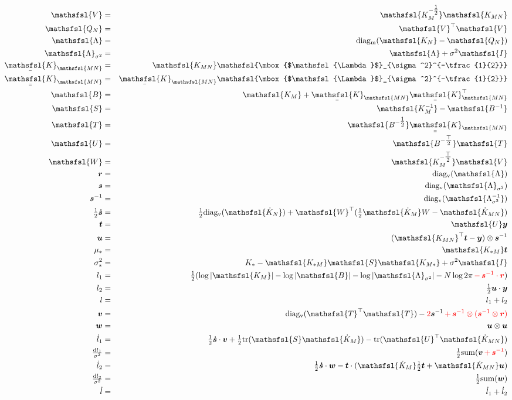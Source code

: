 \documentclass[12pt]{article}
\newcommand{\red}{\textcolor{red}}
\newcommand{\dif}{\mathrm{d}}
\newcommand{\myu}[1]{\underaccent{\bar}{#1}}
\newcommand{\onehalf}{\tfrac{1}{2}}
\newcommand{\mat}[1]{\mbox{$\mathsfsl{#1}$}}
\newcommand{\myvec}[1]{\mbox{\boldmath$#1$}}
\newcommand{\diagv}[1]{\mathrm{diag_v}(#1)}
\newcommand{\diagm}[1]{\mathrm{diag_m}(#1)}
\newcommand{\trace}[1]{\mathrm{tr}(#1)}
\newcommand{\transm}[1]{\mat{#1}^\top}
\newcommand{\imat}[1]{\mat{#1^{-1}}}
\newcommand{\ichol}[1]{\mat{#1^{-\onehalf}}}
\newcommand{\icholt}[1]{\mat{#1^{-\tfrac{\top}{2}}}}
\newcommand{\Km}{\mat{K_M}}
\newcommand{\dKm}{\mat{\dot{K}_M}}
\newcommand{\dkn}{\mat{\dot{K}_N}}
\newcommand{\Kmn}{\mat{K_{MN}}}
\newcommand{\Knm}{\transm{K_{MN}}}
\newcommand{\uKnm}{\myu{\mat{K}}_{\mathsfsl{MN}}^\top}
\newcommand{\dKmn}{\mat{\dot{K}_{MN}}}
\newcommand{\uKmn}{\myu{\mat{K}}_{\mathsfsl{MN}}}
\newcommand{\uuKmn}{\myu{\myu{\mat{K}}}_{\mathsfsl{MN}}}
\newcommand{\dl}{\dot{l}}
\newcommand{\vecr}{\myvec{r}}
\newcommand{\vecs}{\myvec{s}}
\newcommand{\vect}{\myvec{t}}
\newcommand{\vecv}{\myvec{v}}
\newcommand{\vecu}{\myvec{u}}
\newcommand{\vecw}{\myvec{w}}
\newcommand{\vecy}{\myvec{y}}
\newcommand{\vecsdh}{\onehalf\myvec{\dot{s}}}
\newcommand{\vecis}{\myvec{s}^{-1}}
\newcommand{\matB}{\mat{B}}
\newcommand{\matI}{\mat{I}}
\newcommand{\matS}{\mat{S}}
\newcommand{\matT}{\mat{T}}
\newcommand{\matU}{\mat{U}}
\newcommand{\matV}{\mat{V}}
\newcommand{\matW}{\mat{W}}
\newcommand{\Lam}{\mat{\Lambda}}
\newcommand{\Lamss}{\mat{\Lambda}_{\sigma^2}}
\newcommand{\Lamssi}{\imat{\Lambda_{\sigma^2}}}
\begin{document}
\begin{eqnarray*}
\matV & = & \ichol{K_M}\Kmn \\
\mat{Q_N} & = & \transm{V} \matV \\
\Lam & = & \diagm{\mat{K_N} - \mat{Q_N}} \\
\Lamss & = & \Lam + \sigma^2 \matI \\
\uKmn & = & \Kmn \ichol{\Lamss} \\
\uuKmn & = & \uKmn\ichol{\Lamss} \\
\matB & = & \Km + \uKmn\uKnm \\
\matS & = & \imat{K_M} - \imat{B} \\
\matT & = & \ichol{B}\uuKmn \\
\matU & = & \icholt{B}\matT \\
\matW & = & \icholt{K_M}\mat{V} \\
\vecr & = & \diagv{\Lam} \\
\vecs & = & \diagv{\Lamss} \\
\vecis & = & \diagv{\Lamssi} \\
\vecsdh & = & \onehalf\diagv{\dkn} + \transm{W}(\onehalf\dKm W - \dKmn) \\
\vect & = & \matU \vecy \\
\vecu & = & (\Knm \vect - \vecy) \otimes \vecis \\
\mu_* & = & \mat{K_{*M}} \vect \\
\sigma^2_* & = & K_* - \mat{K_{*M}}\matS\mat{K_{M*}} + \sigma^2 \matI \\
l_1 & = & \onehalf (\log|\Km| - \log|\matB| - \log|\Lamss| - N \log 2\pi \red{\, - \, \vecis \cdot \vecr}) \\
l_2 & = & \onehalf \vecu\cdot\vecy \\
l & = & l_1 + l_2 \\
\vecv & = & \diagv{\transm{T}\matT} - \red{2} \vecis \red{\, + \, \vecis\otimes(\vecis \otimes \vecr)} \\
\vecw & = & \vecu \otimes \vecu \\
\dl_1 & = & \vecsdh\cdot\vecv + \onehalf\trace{\matS\dKm} - \trace{\transm{U}\dKmn} \\
\tfrac{\dif l_1}{\sigma^2} & = & \onehalf \mathrm{sum} (\vecv \red {\, + \, \vecis}) \\
\dl_2 & = & \vecsdh\cdot\vecw - \vect\cdot(\dKm \onehalf \vect + \dKmn \vecu) \\
\tfrac{\dif l_2}{\sigma^2} & = & \onehalf \mathrm{sum}(\vecw) \\
\dl & = & \dl_1 + \dl_2 \\
\end{eqnarray*}
\end{document}
